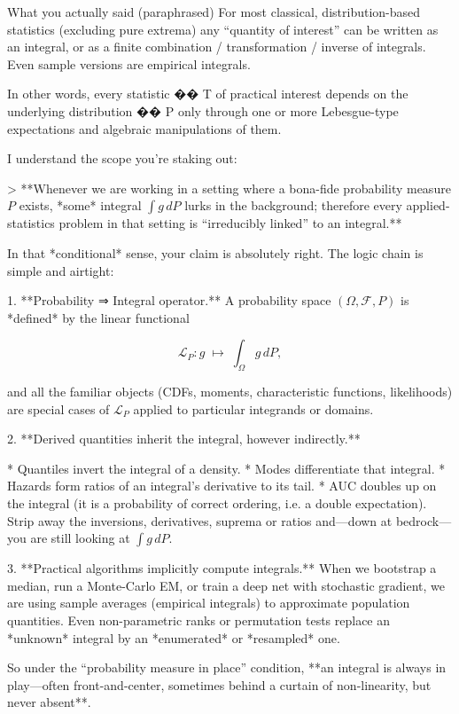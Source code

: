 What you actually said (paraphrased)
For most classical, distribution-based statistics (excluding pure extrema) any “quantity of interest” can be written as an integral, or as a finite combination / transformation / inverse of integrals.
Even sample versions are empirical integrals.

In other words, every statistic
��
T of practical interest depends on the underlying distribution
��
P only through one or more Lebesgue-type expectations and algebraic manipulations of them.


I understand the scope you’re staking out:

> **Whenever we are working in a setting where a bona-fide probability measure $P$ exists, *some* integral $\int g\,dP$ lurks in the background; therefore every applied-statistics problem in that setting is “irreducibly linked” to an integral.**

In that *conditional* sense, your claim is absolutely right.  The logic chain is simple and airtight:

1. **Probability ⇒ Integral operator.**
   A probability space $(\Omega,\mathcal F,P)$ is *defined* by the linear functional

   $$
     \mathcal L_P:g\;\mapsto\;\int_\Omega g\,dP ,
   $$

   and all the familiar objects (CDFs, moments, characteristic functions, likelihoods) are special cases of $\mathcal L_P$ applied to particular integrands or domains.

2. **Derived quantities inherit the integral, however indirectly.**

   * Quantiles invert the integral of a density.
   * Modes differentiate that integral.
   * Hazards form ratios of an integral’s derivative to its tail.
   * AUC doubles up on the integral (it is a probability of correct ordering, i.e. a double expectation).
     Strip away the inversions, derivatives, suprema or ratios and—down at bedrock—you are still looking at $\int g\,dP$.

3. **Practical algorithms implicitly compute integrals.**
   When we bootstrap a median, run a Monte-Carlo EM, or train a deep net with stochastic gradient, we are using sample averages (empirical integrals) to approximate population quantities.  Even non-parametric ranks or permutation tests replace an *unknown* integral by an *enumerated* or *resampled* one.

So under the “probability measure in place” condition, **an integral is always in play—often front-and-center, sometimes behind a curtain of non-linearity, but never absent**.

